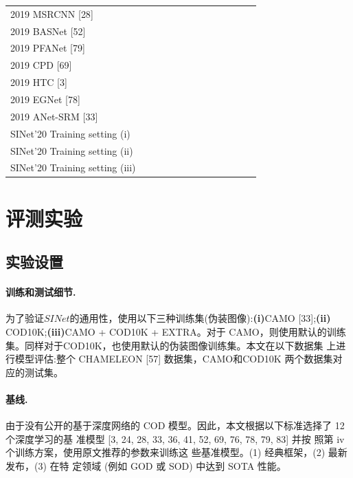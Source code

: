 \documentclass[final]{cvpr}
\newcommand{\mypara}[1]{\paragraph{#1.}}
\begin{document}
\begin{table}[]
{\begin{tabular}{l|llll||llll||llll}
        2019 MSRCNN {[}28{]}            &       &       &       &       &       &       &       &       &       &       &       &       \\
        2019 BASNet {[}52{]}            &       &       &       &       &       &       &       &       &       &       &       &       \\
        2019 PFANet {[}79{]}            &       &       &       &       &       &       &       &       &       &       &       &       \\
        2019 CPD {[}69{]}               &       &       &       &       &       &       &       &       &       &       &       &       \\
        2019 HTC {[}3{]}                &       &       &       &       &       &       &       &       &       &       &       &       \\
        2019 EGNet {[}78{]}             &       &       &       &       &       &       &       &       &       &       &       &       \\
        2019 ANet-SRM {[}33{]}          &       &       &       &       &       &       &       &       &       &       &       &       \\ \hline
        SINet’20 Training setting (i)   &       &       &       &       &       &       &       &       &       &       &       &       \\
        SINet’20 Training setting (ii)  &       &       &       &       &       &       &       &       &       &       &       &       \\
        SINet’20 Training setting (iii) &       &       &       &       &       &       &       &       &       &       &       &       \\ \hline
        \end{tabular}
    }
\end{table}
\section{评测实验}\label{sec:Experiment}
\subsection{实验设置}
\mypara{训练和测试细节}
为了验证$SINet$的通用性，使用以下三种训练集(伪装图像):\textbf{(i)}CAMO [33];\textbf{(ii)} COD10K;\textbf{(iii)}CAMO + COD10K + EXTRA。对于 CAMO，则使用默认的训练集。同样对于COD10K，也使用默认的伪装图像训练集。本文在以下数据集 上进行模型评估:整个 CHAMELEON [57] 数据集，CAMO和COD10K 两个数据集对应的测试集。\mypara{基线}由于没有公开的基于深度网络的 COD 模型。因此，本文根据以下标准选择了 12 个深度学习的基 准模型 [3, 24, 28, 33, 36, 41, 52, 69, 76, 78, 79, 83] 并按 照第 iv 个训练方案，使用原文推荐的参数来训练这 些基准模型。(1) 经典框架，(2) 最新发布，(3) 在特 定领域 (例如 GOD 或 SOD) 中达到 SOTA 性能。
\end{document}
